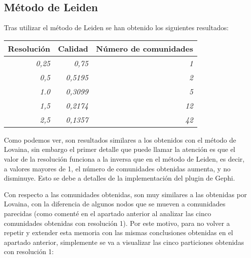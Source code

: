 \subsection{Método de Leiden}

Tras utilizar el método de Leiden se han obtenido los siguientes resultados:

\begin{table}[H]
\centering
\begin{tabular}{|r|r|r|}
\hline
\multicolumn{1}{|c|}{\textbf{Resolución}} & \multicolumn{1}{c|}{\textbf{Calidad}} & \multicolumn{1}{c|}{\textbf{Número de comunidades}} \\ \hline
\textit{0,25}                             & \textit{0,75}                         & \textit{1}                                          \\ \hline
\textit{0,5}                              & \textit{0,5195}                       & \textit{2}                                          \\ \hline
\textit{1.0}                              & \textit{0,3099}                       & \textit{5}                                          \\ \hline
\textit{1,5}                              & \textit{0,2174}                       & \textit{12}                                         \\ \hline
\textit{2,5}                              & \textit{0,1357}                       & \textit{42}                                         \\ \hline
\end{tabular}
\end{table}

Como podemos ver, son resultados similares a los obtenidos con el método de Lovaina, sin embargo el primer detalle que puede llamar la atención es que el valor de la resolución funciona a la inversa que en el método de Leiden, es decir, a valores mayores de 1, el número de comunidades obtenidas aumenta, y no disminuye. Esto se debe a detalles de la implementación del plugin de Gephi.

Con respecto a las comunidades obtenidas, son muy similares a las obtenidas por Lovaina, con la diferencia de algunos nodos que se mueven a comunidades parecidas (como comenté en el apartado anterior al analizar las cinco comunidades obtenidas con resolución 1). Por este motivo, para no volver a repetir y extender esta memoria con las mismas conclusiones obtenidas en el apartado anterior, simplemente se va a visualizar las cinco particiones obtenidas con resolución 1:

